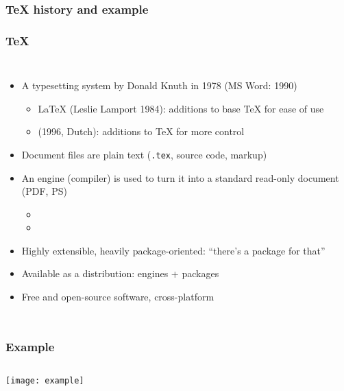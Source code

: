 \documentclass[xetex,colorlinks]{beamer} %
\begin{document}
  \subsubsection{\TeX{} history and example}
  \begin{frame}
    \frametitle{\TeX{}}
    \begin{columns}
    \begin{itemize}
     \item A typesetting system by Donald Knuth in 1978 (MS Word: 1990)
     \begin{itemize}
      \item \LaTeX{} (Leslie Lamport 1984): additions to base \TeX{} for ease of use
      \item {} (1996, Dutch): additions to \TeX{} for more control
     \end{itemize}
     \item Document files are plain text (\texttt{.tex}, source code, markup)
     \item An engine (compiler) is used to turn it into a standard read-only document (PDF, PS)
     \begin{itemize}
      \item {}
      \item {}
     \end{itemize}
     \item Highly extensible, heavily package-oriented: ``there's a package for that''
     \item Available as a distribution: engines + packages
     \item Free and open-source software, cross-platform
    \end{itemize}
    
    
    \end{columns}
  \end{frame}
  
  \begin{frame}
    \frametitle{Example}
    \begin{columns}[c]
      \begin{adjustbox}{width=\textwidth,height=\textheight,keepaspectratio}
	TeX}]{example.tex}
      \end{adjustbox}
      \texttt{[image: example]}
    \end{columns}
  \end{frame}
  
\end{document}

